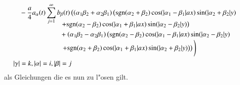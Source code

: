 \begin{refsection}
\begin{align*}
\\
&\phantom{={}}
-
\frac{a}{4}
a_{\alpha}(t)
\sum_{j = 1}^{\infty}
b_{\beta}(t)
\left(
\left(\alpha_1 \beta_2 + \alpha_2 \beta_1 \right)
\left(
\sgn(\alpha_2 + \beta_2)
\cos(|\alpha_1 - \beta_1|ax)\sin(|\alpha_2 + \beta_2|y)
\right.
\right.
\\[-2.5ex]
&\phantom{=-aat\sum\sum...{}}
\left.
+
\sgn(\alpha_2 - \beta_2)
\cos(|\alpha_1 + \beta_1|ax)\sin(|\alpha_2 - \beta_2|y)
\right)
\\[-1.0ex]
&\phantom{=-aat\sum\sum...{}}
+
\left(\alpha_1 \beta_2 - \alpha_2 \beta_1 \right)
\left(
\sgn(\alpha_2 - \beta_2)
\cos(|\alpha_1 - \beta_1|ax)\sin(|\alpha_2 - \beta_2|y)
\right.
\\[-1.0ex]
&\phantom{=-aat\sum\sum...{}}
\left.
\left.
+
\sgn(\alpha_2 + \beta_2)
\cos(|\alpha_1 + \beta_1|ax)\sin(|\alpha_2 + \beta_2|y)
\right)
\right)
\Bigg)
\\
&|\gamma| = k, |\alpha| = i, |\beta| = j
\end{align*}
als Gleichungen die es nun zu l"osen gilt.


\end{refsection}
